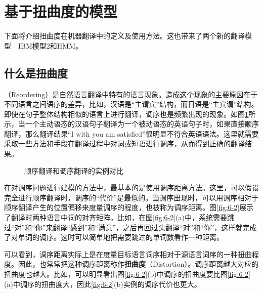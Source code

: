 \section{基于扭曲度的模型}

下面将介绍扭曲度在机器翻译中的定义及使用方法。这也带来了两个新的翻译模型\ \dash\ IBM模型2和HMM。

\subsection{什么是扭曲度}

（Reordering）是自然语言翻译中特有的语言现象。造成这个现象的主要原因在于不同语言之间语序的差异，比如，汉语是“主谓宾”结构，而日语是“主宾谓”结构。即使在句子整体结构相似的语言上进行翻译，调序也是频繁出现的现象。如图\ref{fig:6-1}所示，当一个主动语态的汉语句子翻译为一个被动语态的英语句子时，如果直接顺序翻译，那么翻译结果“I with you am satisfied”很明显不符合英语语法。这里就需要采取一些方法和手段在翻译过程中对词或短语进行调序，从而得到正确的翻译结果。
\begin{figure}[htp]
    \centering

    \caption{顺序翻译和调序翻译的实例对比}
    \label{fig:6-1}
\end{figure}

\parinterval 在对调序问题进行建模的方法中，最基本的是使用调序距离方法。这里，可以假设完全进行顺序翻译时，调序的“代价”是最低的。当调序出现时，可以用调序相对于顺序翻译产生的位置偏移来度量调序的程度，也被称为调序距离。图\ref{fig:6-2}展示了翻译时两种语言中词的对齐矩阵。比如，在图\ref{fig:6-2}(a)中，系统需要跳过“对”和“你”来翻译“感到”和“满意”，之后再回过头翻译“对”和“你”，这样就完成了对单词的调序。这时可以简单地把需要跳过的单词数看作一种距离。

\parinterval 可以看到，调序距离实际上是在度量目标语言词序相对于源语言词序的一种扭曲程度。因此，也常常把这种调序距离称作{\small\sffamily\bfseries{扭曲度}}（Distortion）。调序距离越大对应的扭曲度也越大。比如，可以明显看出图\ref{fig:6-2}(b)中调序的扭曲度要比图\ref{fig:6-2}(a)中调序的扭曲度大，因此\ref{fig:6-2}(b)实例的调序代价也更大。

